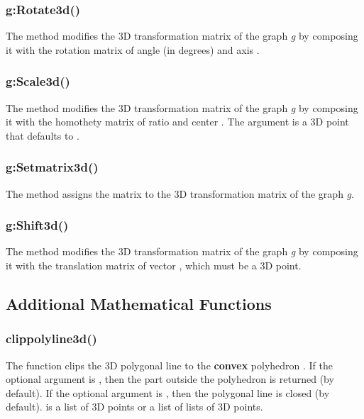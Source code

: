 \subsubsection{g:Rotate3d()}

The method  modifies the 3D transformation matrix of the graph \emph g by composing it with the rotation matrix of angle  (in degrees) and axis .

\subsubsection{g:Scale3d()}

The method  modifies the 3D transformation matrix of the graph \emph g by composing it with the homothety matrix of ratio  and center . The argument  is a 3D point that defaults to .

\subsubsection{g:Setmatrix3d()}

The  method assigns the matrix  to the 3D transformation matrix of the graph \emph g.

\subsubsection{g:Shift3d()}

The  method modifies the 3D transformation matrix of the graph \emph g by composing it with the translation matrix of vector , which must be a 3D point.


\subsection{Additional Mathematical Functions}

\subsubsection{clippolyline3d()}

The function  clips the 3D polygonal line  to the \textbf{convex} polyhedron . If the optional argument  is \true, then the part outside the polyhedron is returned (\false by default). If the optional argument  is \true, then the polygonal line is closed (\false by default).  is a list of 3D points or a list of lists of 3D points.

